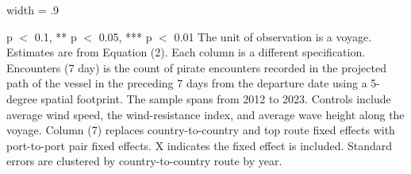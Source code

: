 \begin{table}
\begin{adjustbox}{width = .9\textwidth}
\begin{threeparttable}
\begin{tablenotes}
\item \scriptsize * p $<$ 0.1, ** p $<$ 0.05, *** p $<$ 0.01 The unit of observation is a voyage. Estimates are from Equation (2). Each column is a different specification. Encounters (7 day) is the count of pirate encounters recorded in the projected path of the vessel in the preceding 7 days from the departure date using a 5-degree spatial footprint. The sample spans from 2012 to 2023. Controls include average wind speed, the wind-resistance index, and average wave height along the voyage. Column (7) replaces country-to-country and top route fixed effects with port-to-port pair fixed effects. X indicates the fixed effect is included. Standard errors are clustered by country-to-country route by year.
\end{tablenotes}
\end{threeparttable}
\end{adjustbox}
\end{table}
